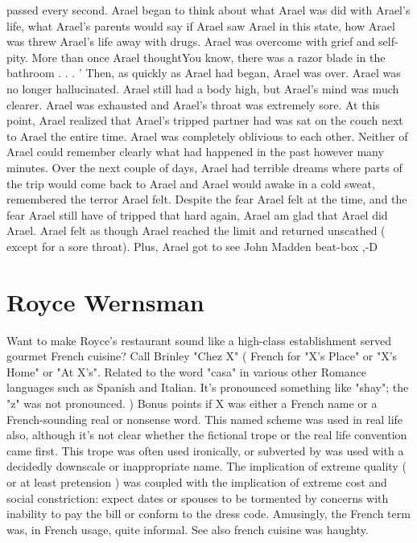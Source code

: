 \documentclass[12pt]{book}
\begin{document}
passed every second. Arael began to think about what Arael was did with Arael's life, what Arael's parents would say if Arael saw Arael in this state, how Arael was threw Arael's life away with drugs. Arael was overcome with grief and self-pity. More than once Arael thoughtYou know, there was a razor blade in the bathroom . . .  ' Then, as quickly as Arael had began, Arael was over. Arael was no longer hallucinated. Arael still had a body high, but Arael's mind was much clearer. Arael was exhausted and Arael's throat was extremely sore. At this point, Arael realized that Arael's tripped partner had was sat on the couch next to Arael the entire time. Arael was completely oblivious to each other. Neither of Arael could remember clearly what had happened in the past however many minutes. Over the next couple of days, Arael had terrible dreams where parts of the trip would come back to Arael and Arael would awake in a cold sweat, remembered the terror Arael felt. Despite the fear Arael felt at the time, and the fear Arael still have of tripped that hard again, Arael am glad that Arael did Arael. Arael felt as though Arael reached the limit and returned unscathed ( except for a sore throat). Plus, Arael got to see John Madden beat-box ,-D



\chapter{Royce Wernsman}

Want to make Royce's restaurant sound like a high-class establishment served gourmet French cuisine? Call Brinley "Chez X" ( French for "X's Place" or "X's Home" or "At X's". Related to the word "casa" in various other Romance languages such as Spanish and Italian. It's pronounced something like "shay"; the "z" was not pronounced. ) Bonus points if X was either a French name or a French-sounding real or nonsense word. This named scheme was used in real life also, although it's not clear whether the fictional trope or the real life convention came first. This trope was often used ironically, or subverted by was used with a decidedly downscale or inappropriate name. The implication of extreme quality ( or at least pretension ) was coupled with the implication of extreme cost and social constriction: expect dates or spouses to be tormented by concerns with inability to pay the bill or conform to the dress code. Amusingly, the French term was, in French usage, quite informal. See also french cuisine was haughty.
\end{document}
